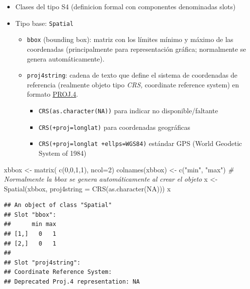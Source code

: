 \documentclass[
  spanish,
]{book}
\newenvironment{Shaded}{\begin{snugshade}}{\end{snugshade}}
\newcommand{\AttributeTok}[1]{\textcolor[rgb]{0.77,0.63,0.00}{#1}}
\newcommand{\CommentTok}[1]{\textcolor[rgb]{0.56,0.35,0.01}{\textit{#1}}}
\newcommand{\ConstantTok}[1]{\textcolor[rgb]{0.00,0.00,0.00}{#1}}
\newcommand{\DecValTok}[1]{\textcolor[rgb]{0.00,0.00,0.81}{#1}}
\newcommand{\FunctionTok}[1]{\textcolor[rgb]{0.00,0.00,0.00}{#1}}
\newcommand{\NormalTok}[1]{#1}
\newcommand{\OtherTok}[1]{\textcolor[rgb]{0.56,0.35,0.01}{#1}}
\newcommand{\StringTok}[1]{\textcolor[rgb]{0.31,0.60,0.02}{#1}}
\theoremstyle{break}
\begin{document}
\begin{itemize}
\item
  Clases del tipo S4 (definicion formal con componentes
  denominadas slots)
\item
  Tipo base: \texttt{Spatial}

  \begin{itemize}
  \item
    \texttt{bbox} (bounding box): matriz con los límites mínimo y máximo de
    las coordenadas (principalmente para representación gráfica;
    normalmente se genera automáticamente).
  \item
    \texttt{proj4string}: cadena de texto que define el sistema de
    coordenadas de referencia (realmente objeto tipo \emph{CRS,}
    coordinate reference system) en formato
    \href{http://trac.osgeo.org/proj}{PROJ.4}.

    \begin{itemize}
    \item
      \texttt{CRS(as.character(NA))} para indicar no disponible/faltante
    \item
      \texttt{CRS(+proj=longlat)} para coordenadas geográficas
    \item
      \texttt{CRS(+proj=longlat\ +ellps=WGS84)} estándar GPS (World
      Geodetic System of 1984)
    \end{itemize}
  \end{itemize}
\end{itemize}

\begin{Shaded}
\begin{Highlighting}[]
\NormalTok{xbbox }\OtherTok{\textless{}{-}} \FunctionTok{matrix}\NormalTok{( }\FunctionTok{c}\NormalTok{(}\DecValTok{0}\NormalTok{,}\DecValTok{0}\NormalTok{,}\DecValTok{1}\NormalTok{,}\DecValTok{1}\NormalTok{), }\AttributeTok{ncol=}\DecValTok{2}\NormalTok{)}
\FunctionTok{colnames}\NormalTok{(xbbox) }\OtherTok{\textless{}{-}} \FunctionTok{c}\NormalTok{(}\StringTok{"min"}\NormalTok{, }\StringTok{"max"}\NormalTok{) }\CommentTok{\# Normalmente la bbox se genera automáticamente al crear el objeto}
\NormalTok{x }\OtherTok{\textless{}{-}} \FunctionTok{Spatial}\NormalTok{(xbbox, }\AttributeTok{proj4string =} \FunctionTok{CRS}\NormalTok{(}\FunctionTok{as.character}\NormalTok{(}\ConstantTok{NA}\NormalTok{)))}
\NormalTok{x}
\end{Highlighting}
\end{Shaded}

\begin{verbatim}
## An object of class "Spatial"
## Slot "bbox":
##      min max
## [1,]   0   1
## [2,]   0   1
## 
## Slot "proj4string":
## Coordinate Reference System:
## Deprecated Proj.4 representation: NA
\end{verbatim}
\end{document}

